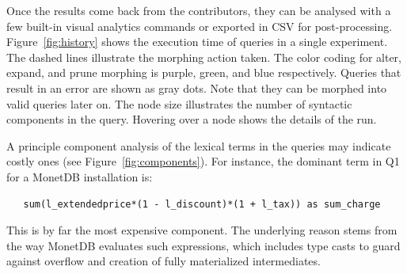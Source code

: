 \documentclass{cidr-2019}
\begin{document}
Once the results come back from the contributors, they can be analysed
with a few built-in visual analytics commands or exported in CSV for
post-processing. Figure~\ref{fig:history} shows the execution time of
queries in a single experiment. The dashed lines illustrate the
morphing action taken. The color coding for alter, expand, and prune
morphing is purple, green, and blue respectively. Queries that result
in an error are shown as gray dots. Note that they can be morphed into
valid queries later on. The node size illustrates the number of
syntactic components in the query. Hovering over a
node shows the details of the run.

A principle
component analysis of the lexical terms in the queries may indicate
costly ones (see Figure~\ref{fig:components}). For instance, the
dominant term in Q1
for a MonetDB installation is:
\begin{verbatim}
   sum(l_extendedprice*(1 - l_discount)*(1 + l_tax)) as sum_charge
\end{verbatim}
This is by far the most expensive component. The underlying reason
stems from the way MonetDB evaluates such expressions, which includes
type casts to guard against overflow and creation of fully
materialized intermediates.
\end{document}
